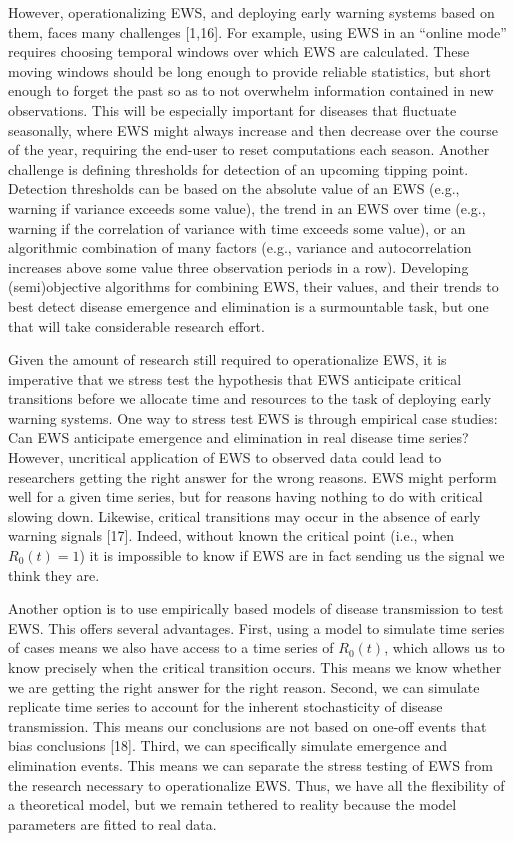 \documentclass[3p]{elsarticle} %
\begin{document}
However, operationalizing EWS, and deploying early warning systems based
on them, faces many challenges {[}1,16{]}. For example, using EWS in an
``online mode'' requires choosing temporal windows over which EWS are
calculated. These moving windows should be long enough to provide
reliable statistics, but short enough to forget the past so as to not
overwhelm information contained in new observations. This will be
especially important for diseases that fluctuate seasonally, where EWS
might always increase and then decrease over the course of the year,
requiring the end-user to reset computations each season. Another
challenge is defining thresholds for detection of an upcoming tipping
point. Detection thresholds can be based on the absolute value of an EWS
(e.g., warning if variance exceeds some value), the trend in an EWS over
time (e.g., warning if the correlation of variance with time exceeds
some value), or an algorithmic combination of many factors (e.g.,
variance and autocorrelation increases above some value three
observation periods in a row). Developing (semi)objective algorithms for
combining EWS, their values, and their trends to best detect disease
emergence and elimination is a surmountable task, but one that will take
considerable research effort.

Given the amount of research still required to operationalize EWS, it is
imperative that we stress test the hypothesis that EWS anticipate
critical transitions before we allocate time and resources to the task
of deploying early warning systems. One way to stress test EWS is
through empirical case studies: Can EWS anticipate emergence and
elimination in real disease time series? However, uncritical application
of EWS to observed data could lead to researchers getting the right
answer for the wrong reasons. EWS might perform well for a given time
series, but for reasons having nothing to do with critical slowing down.
Likewise, critical transitions may occur in the absence of early warning
signals {[}17{]}. Indeed, without known the critical point (i.e., when
\(R_0(t) = 1\)) it is impossible to know if EWS are in fact sending us
the signal we think they are.

Another option is to use empirically based models of disease
transmission to test EWS. This offers several advantages. First, using a
model to simulate time series of cases means we also have access to a
time series of \(R_0(t)\), which allows us to know precisely when the
critical transition occurs. This means we know whether we are getting
the right answer for the right reason. Second, we can simulate replicate
time series to account for the inherent stochasticity of disease
transmission. This means our conclusions are not based on one-off events
that bias conclusions {[}18{]}. Third, we can specifically simulate
emergence and elimination events. This means we can separate the stress
testing of EWS from the research necessary to operationalize EWS. Thus,
we have all the flexibility of a theoretical model, but we remain
tethered to reality because the model parameters are fitted to real
data.
\end{document}
